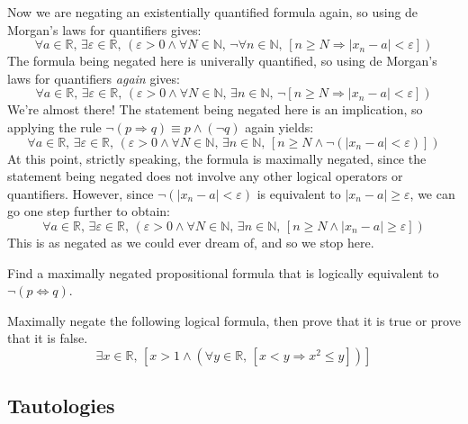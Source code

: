 \begin{example}
%
Now we are negating an existentially quantified formula again, so using de Morgan's laws for quantifiers gives:
\[ \forall a \in \mathbb{R},\, \exists \varepsilon \in \mathbb{R},\, (\varepsilon > 0 \wedge \forall N \in \mathbb{N},\, \neg \forall n \in \mathbb{N},\, [n \ge N \Rightarrow |x_n-a| < \varepsilon])\]
%
The formula being negated here is univerally quantified, so using de Morgan's laws for quantifiers \textit{again} gives:
\[ \forall a \in \mathbb{R},\, \exists \varepsilon \in \mathbb{R},\, (\varepsilon > 0 \wedge \forall N \in \mathbb{N},\, \exists n \in \mathbb{N},\, \neg [n \ge N \Rightarrow |x_n-a| < \varepsilon])\]
%
We're almost there! The statement being negated here is an implication, so applying the rule $\neg (p \Rightarrow q) \equiv p \wedge (\neg q)$ again yields:
\[ \forall a \in \mathbb{R},\, \exists \varepsilon \in \mathbb{R},\, (\varepsilon > 0 \wedge \forall N \in \mathbb{N},\, \exists n \in \mathbb{N},\, [n \ge N \wedge \neg (|x_n - a| < \varepsilon)])\]
%
At this point, strictly speaking, the formula is maximally negated, since the statement being negated does not involve any other logical operators or quantifiers. However, since $\neg (|x_n-a| < \varepsilon)$ is equivalent to $|x_n - a| \ge \varepsilon$, we can go one step further to obtain:
\[ \forall a \in \mathbb{R},\, \exists \varepsilon \in \mathbb{R},\, (\varepsilon > 0 \wedge \forall N \in \mathbb{N},\, \exists n \in \mathbb{N},\, [n \ge N \wedge |x_n - a| \ge \varepsilon])\]
%
This is as negated as we could ever dream of, and so we stop here.
\end{example}

\begin{exercise}
Find a maximally negated propositional formula that is logically equivalent to $\neg (p \Leftrightarrow q)$.
\end{exercise}

\begin{exercise}
Maximally negate the following logical formula, then prove that it is true or prove that it is false.
\[ \exists x \in \mathbb{R},\, [x > 1 \wedge (\forall y \in \mathbb{R},\, [x < y \Rightarrow x^2 \le y])]\]
\end{exercise}

\subsection*{Tautologies}

